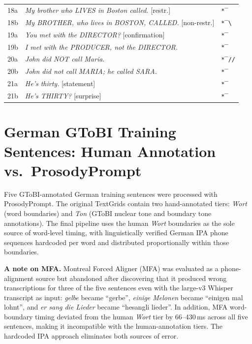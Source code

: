 \begin{longtable}{lll}
18a & \textit{My brother who LIVES in Boston called.} [restr.]   & \texttt{*‾} \\
18b & \textit{My BROTHER, who lives in BOSTON, CALLED.} [non-restr.] & \texttt{*‾\textbackslash} \\
19a & \textit{You met with the DIRECTOR?} [confirmation]         & \texttt{*‾} \\
19b & \textit{I met with the PRODUCER, not the DIRECTOR.}        & \texttt{*‾} \\
20a & \textit{John did NOT call Maria.}                          & \texttt{*‾//} \\
20b & \textit{John did not call MARIA; he called SARA.}          & \texttt{*‾} \\
21a & \textit{He's thirty.} [statement]                          & \texttt{*‾} \\
21b & \textit{He's THIRTY?} [surprise]                           & \texttt{*‾} \\
\end{longtable}


\chapter{German GToBI Training Sentences: Human Annotation vs.\ ProsodyPrompt}
\label{app:german}

Five GToBI-annotated German training sentences were processed with ProsodyPrompt.
The original TextGrids contain two hand-annotated tiers: \textit{Wort} (word
boundaries) and \textit{Ton} (GToBI nuclear tone and boundary tone annotations).
The final pipeline uses the human \textit{Wort} boundaries as the sole source of
word-level timing, with linguistically verified German IPA phone sequences
hardcoded per word and distributed proportionally within those boundaries.

\medskip\noindent
\textbf{A note on MFA.}
Montreal Forced Aligner (MFA) was evaluated as a phone-alignment source but
abandoned after discovering that it produced wrong transcriptions for three of
the five sentences even with the large-v3 Whisper transcript as input:
\textit{gelbe} became ``gerbe'', \textit{einige Melonen} became ``einigen mal
lohnt'', and \textit{er sang die Lieder} became ``hesangli lieder''.
In addition, MFA word-boundary timing deviated from the human \textit{Wort} tier
by 66--430\,ms across all five sentences, making it incompatible with the
human-annotation tiers. The hardcoded IPA approach eliminates both sources of
error.

